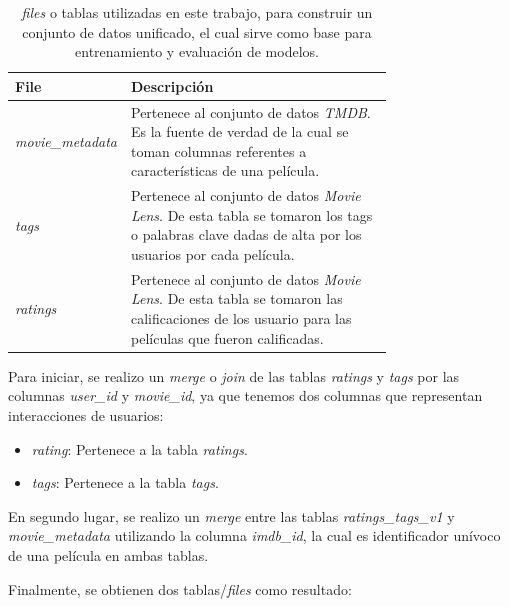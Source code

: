 \documentclass[11pt,a4paper,twoside]{thesis}
\begin{document}
\begin{table}[!htb]
	\centering
	\footnotesize
	\begin{tabular}{l | p{0.75\linewidth}}
		\hline
		File                     & Descripción                                                                                                                                               \\
		\hline

		\textit{movie\_metadata} & Pertenece al conjunto de datos \textit{TMDB}. Es la fuente de verdad de la cual se toman columnas referentes a características de una película.           \\
		\textit{tags}            & Pertenece al conjunto de datos \textit{Movie Lens}. De esta tabla se tomaron los tags o palabras clave dadas de alta por los usuarios por cada película.  \\
		\textit{ratings}         & Pertenece al conjunto de datos \textit{Movie Lens}. De esta tabla se tomaron las calificaciones de los usuario para las películas que fueron calificadas. \\
		\hline
	\end{tabular}
	\caption{
		\textit{files} o tablas utilizadas en este trabajo, para construir un conjunto de datos unificado, el cual sirve como base para entrenamiento y evaluación de modelos.
	}
	\label{table:tableRatings}
\end{table}

Para iniciar, se realizo un \textit{merge} o \textit{join} de las tablas
\textit{ratings} y \textit{tags} por las columnas \textit{user\_id} y
\textit{movie\_id}, ya que tenemos dos columnas que representan interacciones
de usuarios:

\begin{itemize}
	\item \textit{rating}: Pertenece a la tabla \textit{ratings}.
	\item \textit{tags}: Pertenece a la tabla \textit{tags}.
\end{itemize}

En segundo lugar, se realizo un \textit{merge} entre las tablas
\textit{ratings\_tags\_v1} y \textit{movie\_metadata} utilizando la columna
\textit{imdb\_id}, la cual es identificador unívoco de una película en ambas
tablas.

Finalmente, se obtienen dos tablas/\textit{files} como resultado:
\end{document}
